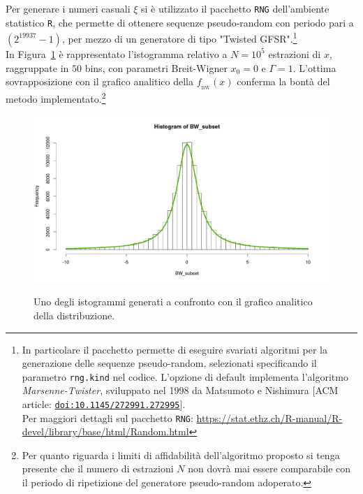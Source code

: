\noindent Per generare i numeri casuali $\xi$ si è utilizzato il pacchetto \texttt{RNG} dell'ambiente statistico \texttt{R}, che permette di ottenere sequenze pseudo-random con periodo pari a $(2^{19937} - 1)$, per mezzo di un generatore di tipo "Twisted GFSR".\footnote{In particolare il pacchetto permette di eseguire svariati algoritmi per la generazione delle sequenze pseudo-random, selezionati specificando il parametro \texttt{rng.kind} nel codice.  L'opzione di default implementa l'algoritmo \emph{Marsenne-Twister}, sviluppato nel 1998 da Matsumoto e Nishimura [ACM article: \href{https://doi.org/10.1145/272991.272995}{\texttt{doi:10.1145/272991.272995}}].\\
Per maggiori dettagli sul pacchetto \texttt{RNG}: \url{https://stat.ethz.ch/R-manual/R-devel/library/base/html/Random.html}}\\

\noindent In Figura~\ref{fig:Es1A_Results} è rappresentato l'istogramma relativo a $N=10^5$ estrazioni di $x$, raggruppate in $50$ bins, con parametri Breit-Wigner $x_0 = 0$ e $\Gamma = 1$. L'ottima sovrapposizione con il grafico analitico della $f_{_{\mathrm{BW}}}(x)$ conferma la bontà del metodo implementato.\footnote{Per quanto riguarda i limiti di affidabilità dell'algoritmo proposto si tenga presente che il numero di estrazioni $N$ non dovrà mai essere comparabile con il periodo di ripetizione del generatore pseudo-random adoperato.}\\

\begin{figure}
	\centering
	\caption{Uno degli istogrammi generati a confronto con il grafico analitico della distribuzione.}
	\includegraphics[width=\textwidth, trim={0 1cm 0 2.3cm},clip]{Immagini/BW_histogram.pdf}
	\label{fig:Es1A_Results}
\end{figure}

